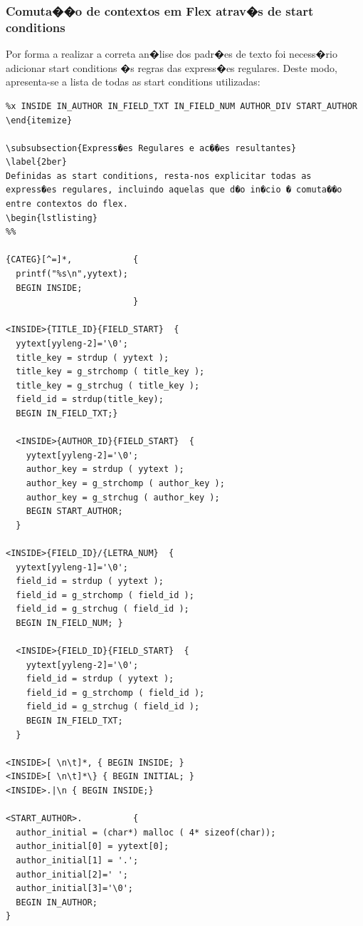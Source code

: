 \documentclass{report}
\begin{document}
\subsubsection{Comuta��o de contextos em Flex atrav�s de start conditions}
Por forma a realizar a correta an�lise dos padr�es de texto foi necess�rio adicionar start conditions �s regras das express�es regulares. Deste modo, apresenta-se a lista de todas as start conditions utilizadas:

\begin{lstlisting}
%x INSIDE IN_AUTHOR IN_FIELD_TXT IN_FIELD_NUM AUTHOR_DIV START_AUTHOR
\end{itemize}

\subsubsection{Express�es Regulares e ac��es resultantes}
\label{2ber}
Definidas as start conditions, resta-nos explicitar todas as express�es regulares, incluindo aquelas que d�o in�cio � comuta��o entre contextos do flex.
\begin{lstlisting}
%%

{CATEG}[^=]*,            {
  printf("%s\n",yytext);
  BEGIN INSIDE;
                         }

<INSIDE>{TITLE_ID}{FIELD_START}  {   
  yytext[yyleng-2]='\0';
  title_key = strdup ( yytext );
  title_key = g_strchomp ( title_key );
  title_key = g_strchug ( title_key );
  field_id = strdup(title_key);
  BEGIN IN_FIELD_TXT;}

  <INSIDE>{AUTHOR_ID}{FIELD_START}  {   
    yytext[yyleng-2]='\0';
    author_key = strdup ( yytext );
    author_key = g_strchomp ( author_key );
    author_key = g_strchug ( author_key );
    BEGIN START_AUTHOR;
  }

<INSIDE>{FIELD_ID}/{LETRA_NUM}  {   
  yytext[yyleng-1]='\0';
  field_id = strdup ( yytext );
  field_id = g_strchomp ( field_id );
  field_id = g_strchug ( field_id );
  BEGIN IN_FIELD_NUM; }

  <INSIDE>{FIELD_ID}{FIELD_START}  {   
    yytext[yyleng-2]='\0';
    field_id = strdup ( yytext );
    field_id = g_strchomp ( field_id );
    field_id = g_strchug ( field_id );
    BEGIN IN_FIELD_TXT;
  }

<INSIDE>[ \n\t]*, { BEGIN INSIDE; }
<INSIDE>[ \n\t]*\} { BEGIN INITIAL; }
<INSIDE>.|\n { BEGIN INSIDE;}

<START_AUTHOR>.          {
  author_initial = (char*) malloc ( 4* sizeof(char));
  author_initial[0] = yytext[0];
  author_initial[1] = '.';
  author_initial[2]=' ';
  author_initial[3]='\0';
  BEGIN IN_AUTHOR;
}


\end{lstlisting}
\end{document}
